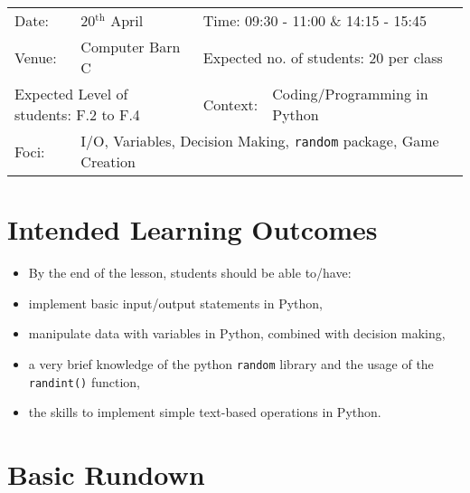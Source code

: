 \documentclass{article}
\def\s{students }
\begin{document}
\begin{center}

\begin{tabular}{lllll}
Date: & 20$^{\text{th}}$ April & \multicolumn{3}{l}{Time: 09:30 - 11:00 \& 14:15 - 15:45} \\
Venue: & Computer Barn C & \multicolumn{3}{l}{Expected no. of students: 20 per class} \\
\multicolumn{2}{l}{Expected Level of students: F.2 to F.4} & Context: & Coding/Programming in Python &\\
Foci: & \multicolumn{4}{l}{I/O, Variables, Decision Making, \texttt{random} package, Game Creation}\\
\end{tabular}
\end{center}

\section*{Intended Learning Outcomes}

\begin{itemize}
	\item[] By the end of the lesson, \s should be able to/have:
	\item implement basic input/output statements in Python,
	\item manipulate data with variables in Python, combined with decision making,
	\item a very brief knowledge of the python \texttt{random} library and the usage of the \texttt{randint()} function,
	\item the skills to implement simple text-based operations in Python.
\end{itemize}


\section*{Basic Rundown}
\end{document}

